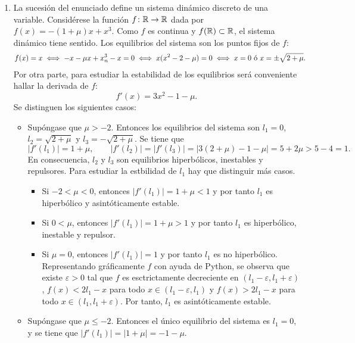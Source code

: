 \documentclass[11pt]{report}
\begin{document}
\begin{solution}
    \hfill \begin{enumerate}
        \item La sucesión del enunciado define un sistema dinámico discreto de una variable. Considérese la función $f \colon \mathbb R \to \mathbb R$ dada por $f(x) = -(1+\mu)x+x^3$. Como $f$ es continua y $f(\mathbb R)\subset\mathbb R$, el sistema dinámico tiene sentido. Los equilibrios del sistema son los puntos fijos de $f$:
        \begin{align*}
            f(x) &= x \iff -x-\mu x +x_n^3 -x = 0 \iff x(x^2-2-\mu) = 0 \iff x = 0 \textup{ ó } x = \pm \sqrt{2+\mu}.
        \end{align*}
        Por otra parte, para estudiar la estabilidad de los equilibrios será conveniente hallar la derivada de $f$:
        \[f'(x) = 3x^2-1-\mu.\]
        Se distinguen los siguientes casos:
        \begin{itemize}
            \item Supóngase que $\mu > -2$. Entonces los equilibrios del sistema son $l_1 = 0$, $l_2 = \sqrt{2+\mu}$ y $l_3 = -\sqrt{2+\mu}$. Se tiene que \[|f'(l_1)| = 1+\mu, \qquad |f'(l_2)| = |f'(l_3)| = |3(2+\mu)-1-\mu| = 5+2\mu > 5-4=1.\] En consecuencia, $l_2$ y $l_3$ son equilibrios hiperbólicos, inestables y repulsores. Para estudiar la estbilidad de $l_1$ hay que distinguir más casos.
            \begin{itemize}
                \item Si $-2 < \mu < 0$, entonces $|f'(l_1)| = 1+\mu < 1$ y por tanto $l_1$ es hiperbólico y asintóticamente estable. 
                \item Si $0 < \mu$, entonces $|f'(l_1)| = 1+\mu > 1$ y por tanto $l_1$ es hiperbólico, inestable y repulsor. 
                \item Si $\mu = 0$, entonces $|f'(l_1)|=1$ y por tanto $l_1$ es no hiperbólico. Representando gráficamente $f$ con ayuda de Python, se observa que existe $\varepsilon>0$ tal que $f$ es esctrictamente decreciente en $(l_1-\varepsilon,l_1+\varepsilon)$, $f(x) < 2l_1-x$ para todo $x \in (l_1-\varepsilon,l_1)$ y $f(x) > 2l_1-x$ para todo $x \in (l_1,l_1+\varepsilon)$. Por tanto, $l_1$ es asintóticamente estable.
            \end{itemize}
            \item Supóngase que $\mu \leq -2$. Entonces el único equilibrio del sistema es $l_1 = 0$, y se tiene que $|f'(l_1)| = |1+\mu| = -1-\mu$. 
            \begin{itemize}

\end{itemize}
\end{itemize}
\end{enumerate}
\end{solution}
\end{document}

